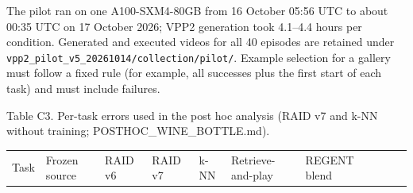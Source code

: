 \documentclass[11pt,a4paper]{article}
\begin{document}
The pilot ran on one A100-SXM4-80GB from 16 October 05:56 UTC to about 00:35 UTC on 17 October 2026; VPP2 generation took 4.1--4.4 hours per condition. Generated and executed videos for all 40 episodes are retained under \texttt{vpp2\_pilot\_v5\_20261014/collection/pilot/}. Example selection for a gallery must follow a fixed rule (for example, all successes plus the first start of each task) and must include failures.

Table C3. Per-task errors used in the post hoc analysis (RAID v7 and k-NN without training; POSTHOC\_WINE\_BOTTLE.md).

{\def\LTcaptype{none} %
{\small
\begin{longtable}[]{@{}
  >{\raggedright\arraybackslash}p{}
  >{\raggedright\arraybackslash}p{}
  >{\raggedright\arraybackslash}p{}
  >{\raggedright\arraybackslash}p{}
  >{\raggedright\arraybackslash}p{}
  >{\raggedright\arraybackslash}p{}
  >{\raggedright\arraybackslash}p{}
  >{\raggedright\arraybackslash}p{}
  >{\raggedright\arraybackslash}p{}
  >{\raggedright\arraybackslash}p{}@{}}
\toprule\noalign{}
\begin{minipage}[b]{\linewidth}\raggedright
Task
\end{minipage} & \begin{minipage}[b]{\linewidth}\raggedright
Frozen source
\end{minipage} & \begin{minipage}[b]{\linewidth}\raggedright
RAID v6
\end{minipage} & \begin{minipage}[b]{\linewidth}\raggedright
RAID v7
\end{minipage} & \begin{minipage}[b]{\linewidth}\raggedright
k-NN
\end{minipage} & \begin{minipage}[b]{\linewidth}\raggedright
Retrieve-and-play
\end{minipage} & \begin{minipage}[b]{\linewidth}\raggedright
REGENT blend
\end{minipage} & \begin{minipage}[b]{\linewidth}\raggedright

\end{minipage}
\end{longtable}}}
\end{document}
